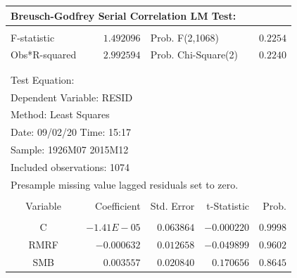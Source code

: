 \documentclass[12pt]{article}
\numberwithin{equation}{section} %
\begin{document}
\begin{table}[H]
\centering
\begin{tabular}{lrrrr}
\multicolumn{4}{l}{Breusch-Godfrey Serial Correlation LM Test:}&\multicolumn{1}{c}{}\\
[4.5pt] \hline \\ [-4.5pt]
\multicolumn{1}{l}{F-statistic}&\multicolumn{1}{r}{$1.492096$}&\multicolumn{2}{l}{Prob. F(2,1068)}&\multicolumn{1}{r}{$0.2254$}\\
\multicolumn{1}{l}{Obs*R-squared}&\multicolumn{1}{r}{$2.992594$}&\multicolumn{2}{l}{Prob. Chi-Square(2)}&\multicolumn{1}{r}{$0.2240$}\\
[4.5pt] \hline \\ [-4.5pt]
\multicolumn{1}{c}{}&\multicolumn{1}{c}{}&\multicolumn{1}{c}{}&\multicolumn{1}{c}{}&\multicolumn{1}{c}{}\\
\multicolumn{2}{l}{Test Equation:}&\multicolumn{1}{c}{}&\multicolumn{1}{c}{}&\multicolumn{1}{c}{}\\
\multicolumn{3}{l}{Dependent Variable: RESID}&\multicolumn{1}{c}{}&\multicolumn{1}{c}{}\\
\multicolumn{2}{l}{Method: Least Squares}&\multicolumn{1}{c}{}&\multicolumn{1}{c}{}&\multicolumn{1}{c}{}\\
\multicolumn{2}{l}{Date: 09/02/20   Time: 15:17}&\multicolumn{1}{c}{}&\multicolumn{1}{c}{}&\multicolumn{1}{c}{}\\
\multicolumn{2}{l}{Sample: 1926M07 2015M12}&\multicolumn{1}{c}{}&\multicolumn{1}{c}{}&\multicolumn{1}{c}{}\\
\multicolumn{3}{l}{Included observations: 1074}&\multicolumn{1}{c}{}&\multicolumn{1}{c}{}\\
\multicolumn{5}{l}{Presample missing value lagged residuals set to zero.}\\
[4.5pt] \hline \\ [-4.5pt]
\multicolumn{1}{c}{Variable}&\multicolumn{1}{r}{Coefficient}&\multicolumn{1}{r}{Std. Error}&\multicolumn{1}{r}{t-Statistic}&\multicolumn{1}{r}{Prob.}\\
[4.5pt] \hline \\ [-4.5pt]
\multicolumn{1}{c}{C}&\multicolumn{1}{r}{$-1.41E-05$}&\multicolumn{1}{r}{$0.063864$}&\multicolumn{1}{r}{$-0.000220$}&\multicolumn{1}{r}{$0.9998$}\\
\multicolumn{1}{c}{RMRF}&\multicolumn{1}{r}{$-0.000632$}&\multicolumn{1}{r}{$0.012658$}&\multicolumn{1}{r}{$-0.049899$}&\multicolumn{1}{r}{$0.9602$}\\
\multicolumn{1}{c}{SMB}&\multicolumn{1}{r}{$0.003557$}&\multicolumn{1}{r}{$0.020840$}&\multicolumn{1}{r}{$0.170656$}&\multicolumn{1}{r}{$0.8645$}\\

\end{tabular}
\end{table}
\end{document}
